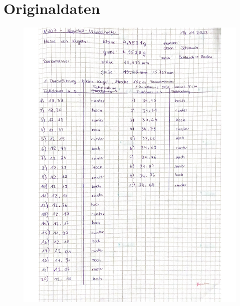 \section{Originaldaten}
\label{sec:Originaldaten}
\begin{figure}[H]
  \centering
  \includegraphics[width=\textwidth]{Messwerte_1.pdf}
  \label{fig:Messungen_1}
\end{figure}
